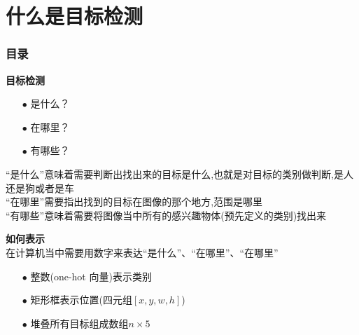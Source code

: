 \section{什么是目标检测}
\begin{frame}[allowframebreaks]
    \frametitle{\textsc{目录}} \vspace{-0.3cm}
    \begin{spacing}{0.0}
    \end{spacing}   %
\end{frame}

\begin{frame}
    \noindent\large\textbf{目标检测}
    \vspace{0.4cm}
    \begin{itemize}
        \item[$ \bullet $] 是什么？
        \item[$ \bullet $] 在哪里？
        \item[$ \bullet $] 有哪些？
    \end{itemize}
    \vspace{1cm}
    “是什么”意味着需要判断出找出来的目标是什么,也就是对目标的类别做判断,是人还是狗或者是车\\
    \vspace{1em}
    “在哪里”需要指出找到的目标在图像的那个地方,范围是哪里\\
    \vspace{1em}
    “有哪些”意味着需要将图像当中所有的感兴趣物体(预先定义的类别)找出来\\
\end{frame}

\begin{frame}
    \noindent\large\textbf{如何表示}\\
    在计算机当中需要用数字来表达“是什么”、“在哪里”、“在哪里”
    \vspace{1em}
    \begin{itemize}
        \item[$ \bullet $] 整数(one-hot 向量)表示类别
        \item[$ \bullet $] 矩形框表示位置(四元组$[x,y,w,h]$)
        \item[$ \bullet $] 堆叠所有目标组成数组$n\times5$
    \end{itemize}
    \vspace{1em}
    \begin{figure}
        \hspace{1cm}
    \end{figure}
\end{frame}

